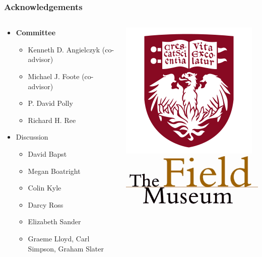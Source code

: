 \documentclass{beamer}
\begin{document}
\begin{frame}
  \frametitle{Acknowledgements}
  \begin{columns}
    \begin{column}{0.5\textwidth}
      \begin{itemize}
        \item \textbf{Committee}
          \begin{itemize}
            \item Kenneth D. Angielczyk (co-advisor)
            \item Michael J. Foote (co-advisor)
            \item P. David Polly
            \item Richard H. Ree
          \end{itemize}
        \item Discussion
          \begin{itemize}
            \item David Bapst
            \item Megan Boatright
            \item Colin Kyle
            \item Darcy Ross
            \item Elizabeth Sander
            \item Graeme Lloyd, Carl Simpson, Graham Slater
          \end{itemize}
      \end{itemize}
    \end{column}
    \begin{column}{0.5\textwidth}
      \includegraphics[height = 0.25\textheight, keepaspectratio = true]{figure/chicago} \\
      \includegraphics[height = 0.25\textheight, width = \textwidth, keepaspectratio = true]{figure/field} \\
    \end{column}
  \end{columns}
\end{frame}
\end{document}
